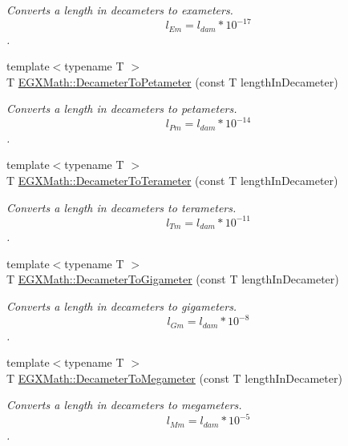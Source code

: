 \begin{DoxyCompactItemize}
\begin{DoxyCompactList}\small\item\em Converts a length in decameters to exameters. \[ l_{Em}=l_{dam} * 10^{-17} \]. \end{DoxyCompactList}\item 
{\footnotesize template$<$typename T $>$ }\\T \mbox{\hyperlink{group___e_g_x_math-_conversions-_length_conversions-_decameter-_s_i_ga0475fbe33c57dc772e3121f776d82fd0}{E\+G\+X\+Math\+::\+Decameter\+To\+Petameter}} (const T length\+In\+Decameter)
\begin{DoxyCompactList}\small\item\em Converts a length in decameters to petameters. \[ l_{Pm}=l_{dam} * 10^{-14} \]. \end{DoxyCompactList}\item 
{\footnotesize template$<$typename T $>$ }\\T \mbox{\hyperlink{group___e_g_x_math-_conversions-_length_conversions-_decameter-_s_i_ga94859159b401c261bf562ab4e3071508}{E\+G\+X\+Math\+::\+Decameter\+To\+Terameter}} (const T length\+In\+Decameter)
\begin{DoxyCompactList}\small\item\em Converts a length in decameters to terameters. \[ l_{Tm}=l_{dam} * 10^{-11} \]. \end{DoxyCompactList}\item 
{\footnotesize template$<$typename T $>$ }\\T \mbox{\hyperlink{group___e_g_x_math-_conversions-_length_conversions-_decameter-_s_i_gaa889b61d8f9874010be977ce71b4dfaf}{E\+G\+X\+Math\+::\+Decameter\+To\+Gigameter}} (const T length\+In\+Decameter)
\begin{DoxyCompactList}\small\item\em Converts a length in decameters to gigameters. \[ l_{Gm}=l_{dam} * 10^{-8} \]. \end{DoxyCompactList}\item 
{\footnotesize template$<$typename T $>$ }\\T \mbox{\hyperlink{group___e_g_x_math-_conversions-_length_conversions-_decameter-_s_i_ga84e31290bf0886972b10479e4fd37fb4}{E\+G\+X\+Math\+::\+Decameter\+To\+Megameter}} (const T length\+In\+Decameter)
\begin{DoxyCompactList}\small\item\em Converts a length in decameters to megameters. \[ l_{Mm}=l_{dam} * 10^{-5} \]. \end{DoxyCompactList}\item 

\end{DoxyCompactItemize}
